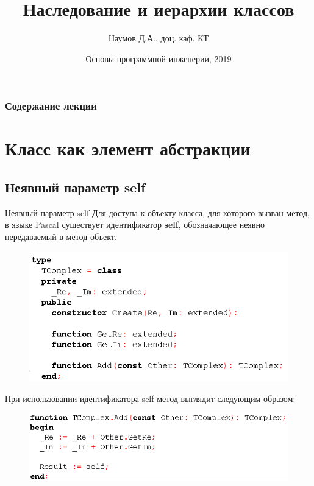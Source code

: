 \documentclass{beamer}
\title[Software Design]{Наследование и иерархии классов}
\author{Наумов Д.А., доц. каф. КТ}
\date[30.09.2019] {Основы программной инженерии, 2019}
\begin{document}
\begin{frame}
  \titlepage
\end{frame}
  
\begin{frame}
  \frametitle{Содержание лекции}
  \tableofcontents  
\end{frame}

\section{Класс как элемент абстракции}

\subsection{Неявный параметр self}
\begin{frame}{Неявный параметр self}
Для доступа к объекту класса, для которого вызван метод, в языке Pascal
существует идентификатор \textbf{self}, обозначающее неявно передаваемый в метод объект.
\begin{figure}[h]
\centering
\includegraphics[scale=0.45]{images/lec06-pic01.png}
\end{figure}
При использовании идентификатора self метод выглядит следующим образом:
\begin{figure}[h]
\centering
\includegraphics[scale=0.45]{images/lec06-pic02.png}
\end{figure}
\end{frame}
\end{document}
